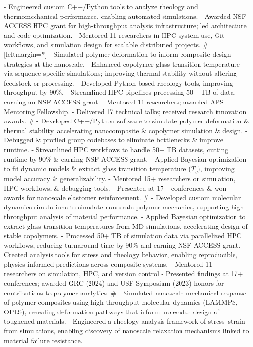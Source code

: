 - Engineered custom C++/Python tools to analyze rheology and thermomechanical performance, enabling automated simulations.
- Awarded NSF ACCESS HPC grant for high-throughput analysis infrastructure; led architecture and code optimization.
- Mentored 11 researchers in HPC system use, Git workflows, and simulation design for scalable distributed projects.
#[leftmargin=*]
- Simulated polymer deformation to inform composite design strategies at the nanoscale.
- Enhanced copolymer glass transition temperature via sequence-specific simulations; improving thermal stability without altering feedstock or processing.
- Developed Python-based rheology tools, improving throughput by 90\%.
- Streamlined HPC pipelines processing 50+ TB of data, earning an NSF ACCESS grant.
- Mentored 11 researchers; awarded APS Mentoring Fellowship.
- Delivered 17 technical talks; received research innovation awards.
#
- Developed C++/Python software to simulate polymer deformation \& thermal stability, accelerating nanocomposite \& copolymer simulation \& design.
- Debugged \& profiled group codebases to eliminate bottlenecks \& improve runtime.
- Streamlined HPC workflows to handle 50+ TB datasets, cutting runtime by 90\% \& earning NSF ACCESS grant.
- Applied Bayesian optimization to fit dynamic models \& extract glass transition temperature ($T_g$), improving model accuracy \& generalizability.
- Mentored 15+ researchers on simulation, HPC workflows, \& debugging tools.
- Presented at 17+ conferences \& won awards for nanoscale elastomer reinforcement.
#
- Developed custom molecular dynamics simulations to simulate nanoscale polymer mechanics, supporting high-throughput analysis of material performance.
- Applied Bayesian optimization to extract glass transition temperatures from MD simulations, accelerating design of stable copolymers.
- Processed 50+ TB of simulation data via parallelized HPC workflows, reducing turnaround time by 90\% and earning NSF ACCESS grant.
- Created analysis tools for stress and rheology behavior, enabling reproducible, physics-informed predictions across composite systems.
- Mentored 11+ researchers on simulation, HPC, and version control
- Presented findings at 17+ conferences; awarded GRC (2024) and USF Symposium (2023) honors for contributions to polymer analytics.
#
- Simulated nanoscale mechanical response of polymer composites using high-throughput molecular dynamics (LAMMPS, OPLS), revealing deformation pathways that inform molecular design of toughened materials.
- Engineered a rheology analysis framework of stress–strain from simulations, enabling discovery of nanoscale relaxation mechanisms linked to material failure resistance.
